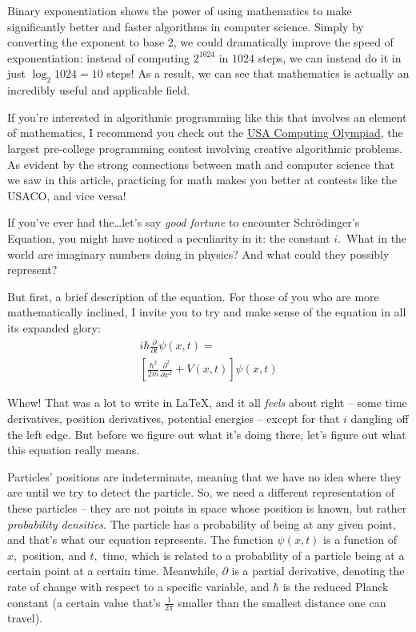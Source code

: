 \documentclass{article}
\begin{document}
\begin{multicols}{3}
Binary exponentiation shows the power of using mathematics to make significantly better and faster algorithms in computer science. Simply by converting the exponent to base $2$, we could dramatically improve the speed of exponentiation: instead of computing $2^{1024}$ in $1024$ steps, we can instead do it in just $\log_2{1024}=10$ steps! As a result, we can see that mathematics is actually an incredibly useful and applicable field.

If you're interested in algorithmic programming like this that involves an element of mathematics, I recommend you check out the \href{http://usaco.org/}{USA Computing Olympiad}, the largest pre-college programming contest involving creative algorithmic problems. As evident by the strong connections between math and computer science that we saw in this article, practicing for math makes you better at contests like the USACO, and vice versa!
\closearticle

If you've ever had the\dots let's say \textit{good fortune} to encounter Schr\"odinger's Equation, you might have noticed a peculiarity in it: the constant $i$. What in the world are imaginary numbers doing in physics? And what could they possibly represent?

But first, a brief description of the equation. For those of you who are more mathematically inclined, I invite you to try and make sense of the equation in all its expanded glory:
\begin{multline*}
    i\hbar \frac{\partial}{\partial t} \psi (x,t)= \\
    \left[ \frac{\hbar^2}{2m}\frac{\partial^2}{\partial x^2}+V(x,t)\right] \psi (x,t)
\end{multline*}
    
Whew! That was a lot to write in \LaTeX, and it all \textit{feels} about right -- some time derivatives, position derivatives, potential energies -- except for that $i$ dangling off the left edge. But before we figure out what it's doing there, let's figure out what this equation really means. 

Particles' positions are indeterminate, meaning that we have no idea where they are until we try to detect the particle.
So, we need a different representation of these particles -- they are not points in space whose position is known, but rather \textit{probability densities}. 
The particle has a probability of being at any given point, and that's what our equation represents. The function $\psi(x,t)$ is a function of $x,$ position, and $t,$ time, which is related to a probability of a particle being at a certain point at a certain time. Meanwhile, $\partial$ is a partial derivative, denoting the rate of change with respect to a specific variable, and $\hbar$ is the reduced Planck constant (a certain value that's $\frac{1}{2\pi}$ smaller than the smallest distance one can travel).


\end{multicols}
\end{document}
